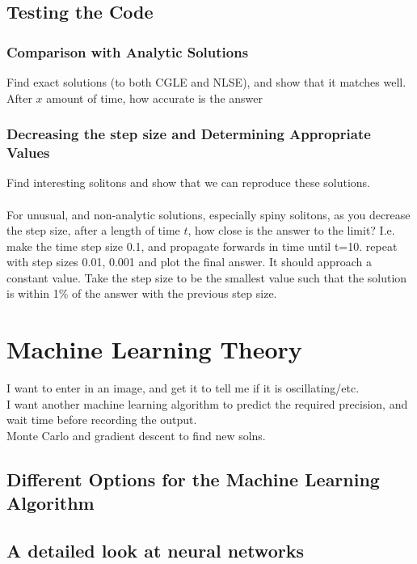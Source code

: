 \documentclass[a4paper,12pt]{report}
\begin{document}
\section{Testing the Code}
\subsection{Comparison with Analytic Solutions}
Find exact solutions (to both CGLE and NLSE), and show that it matches well.
After $x$ amount of time, how accurate is the answer
\subsection{Decreasing the step size and Determining Appropriate Values}
Find interesting solitons and show that we can reproduce these solutions.\\\\
For unusual, and non-analytic solutions, especially spiny solitons, as you decrease the step size, after a length of time $t$, how close is the answer to the limit? I.e. make the time step size 0.1, and propagate forwards in time until t=10. repeat with step sizes 0.01, 0.001 and plot the final answer. It should approach a constant value. Take the step size to be the smallest value such that the solution is within 1\% of the answer with the previous step size.















\chapter{Machine Learning Theory}
I want to enter in an image, and get it to tell me if it is oscillating/etc.\\
I want another machine learning algorithm to predict the required precision, and wait time before recording the output.\\
Monte Carlo and gradient descent to find new solns.\\
\section{Different Options for the Machine Learning Algorithm}
\section{A detailed look at neural networks}
\end{document}
